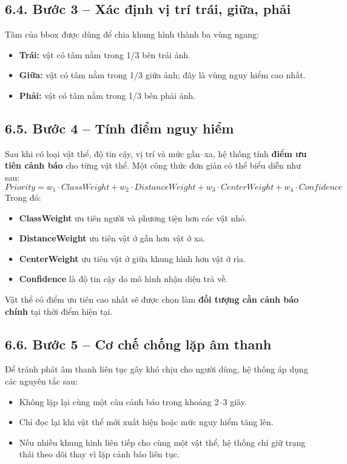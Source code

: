 \documentclass[11pt, a4paper]{article}
\begin{document}
\subsection*{6.4. Bước 3 -- Xác định vị trí trái, giữa, phải}
Tâm của bbox được dùng để chia khung hình thành ba vùng ngang:
\begin{itemize}
    \item \textbf{Trái:} vật có tâm nằm trong 1/3 bên trái ảnh.
    \item \textbf{Giữa:} vật có tâm nằm trong 1/3 giữa ảnh; đây là vùng nguy hiểm cao nhất.
    \item \textbf{Phải:} vật có tâm nằm trong 1/3 bên phải ảnh.
\end{itemize}

\subsection*{6.5. Bước 4 -- Tính điểm nguy hiểm}
Sau khi có loại vật thể, độ tin cậy, vị trí và mức gần--xa, hệ thống tính \textbf{điểm ưu tiên cảnh báo} cho từng vật thể. Một công thức đơn giản có thể biểu diễn như sau:
\[
Priority = w_1 \cdot ClassWeight + w_2 \cdot DistanceWeight + w_3 \cdot CenterWeight + w_4 \cdot Confidence
\]
Trong đó:
\begin{itemize}
    \item \textbf{ClassWeight} ưu tiên người và phương tiện hơn các vật nhỏ.
    \item \textbf{DistanceWeight} ưu tiên vật ở gần hơn vật ở xa.
    \item \textbf{CenterWeight} ưu tiên vật ở giữa khung hình hơn vật ở rìa.
    \item \textbf{Confidence} là độ tin cậy do mô hình nhận diện trả về.
\end{itemize}

Vật thể có điểm ưu tiên cao nhất sẽ được chọn làm \textbf{đối tượng cần cảnh báo chính} tại thời điểm hiện tại.

\subsection*{6.6. Bước 5 -- Cơ chế chống lặp âm thanh}
Để tránh phát âm thanh liên tục gây khó chịu cho người dùng, hệ thống áp dụng các nguyên tắc sau:
\begin{itemize}
    \item Không lặp lại cùng một câu cảnh báo trong khoảng 2--3 giây.
    \item Chỉ đọc lại khi vật thể mới xuất hiện hoặc mức nguy hiểm tăng lên.
    \item Nếu nhiều khung hình liên tiếp cho cùng một vật thể, hệ thống chỉ giữ trạng thái theo dõi thay vì lặp cảnh báo liên tục.
\end{itemize}
\end{document}
